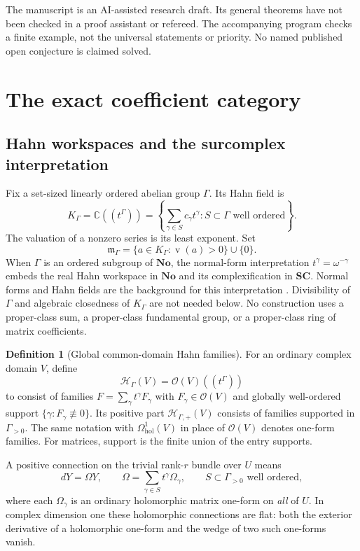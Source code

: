 \documentclass[11pt,letterpaper]{article}
\numberwithin{equation}{section}
\theoremstyle{definition}
\newtheorem{definition}[theorem]{Definition}
\theoremstyle{remark}
\newcommand{\C}{\mathbb C}
\newcommand{\No}{\mathbf{No}}
\newcommand{\SC}{\mathbf{SC}}
\newcommand{\OO}{\mathcal O}
\newcommand{\HH}{\mathcal H}
\newcommand{\mm}{\mathfrak m}
\newcommand{\val}{\operatorname{v}}
\newcommand{\K}{K_\Gamma}
\newcommand{\Hp}{\HH_{\Gamma,+}}
\begin{document}
The manuscript is an AI-assisted research draft. Its general theorems have
not been checked in a proof assistant or refereed. The accompanying program
checks a finite example, not the universal statements or priority. No named
published open conjecture is claimed solved.

\section{The exact coefficient category}\label{sec:category}

\subsection{Hahn workspaces and the surcomplex interpretation}
Fix a set-sized linearly ordered abelian group $\Gamma$. Its Hahn field is
\[
 \K=\C((t^\Gamma))
 =\left\{\sum_{\gamma\in S}c_\gamma t^\gamma:
              S\subset\Gamma\text{ well ordered}\right\}.
\]
The valuation of a nonzero series is its least exponent. Set
\[
 \mm_\Gamma=\{a\in\K:\val(a)>0\}\cup\{0\}.
\]
When $\Gamma$ is an ordered subgroup of $\No$, the normal-form interpretation
$t^\gamma=\omega^{-\gamma}$ embeds the real Hahn workspace in $\No$ and its
complexification in $\SC$. Normal forms and Hahn fields are the background
for this interpretation \cite{poonen,bournez}. Divisibility of $\Gamma$ and
algebraic closedness of $\K$ are not needed below. No construction uses a
proper-class sum, a proper-class fundamental group, or a proper-class ring
of matrix coefficients.

\begin{definition}[Global common-domain Hahn families]\label{def:H}
For an ordinary complex domain $V$, define
\[
 \HH_\Gamma(V)=\OO(V)((t^\Gamma))
\]
to consist of families $F=\sum_\gamma t^\gamma F_\gamma$ with
$F_\gamma\in\OO(V)$ and globally well-ordered support
$\{\gamma:F_\gamma\not\equiv0\}$. Its positive part $\Hp(V)$ consists of
families supported in $\Gamma_{>0}$. The same notation with
$\Omega^1_{\mathrm{hol}}(V)$ in place of $\OO(V)$ denotes one-form families.
For matrices, support is the finite union of the entry supports.
\end{definition}

A positive connection on the trivial rank-$r$ bundle over $U$ means
\begin{equation}\label{eq:connection}
 dY=\Omega Y,\qquad
 \Omega=\sum_{\gamma\in S}t^\gamma\Omega_\gamma,
 \qquad S\subset\Gamma_{>0}\text{ well ordered},
\end{equation}
where each $\Omega_\gamma$ is an ordinary holomorphic matrix one-form on
\emph{all} of $U$. In complex dimension one these holomorphic connections
are flat: both the exterior derivative of a holomorphic one-form and the
wedge of two such one-forms vanish.
\end{document}
